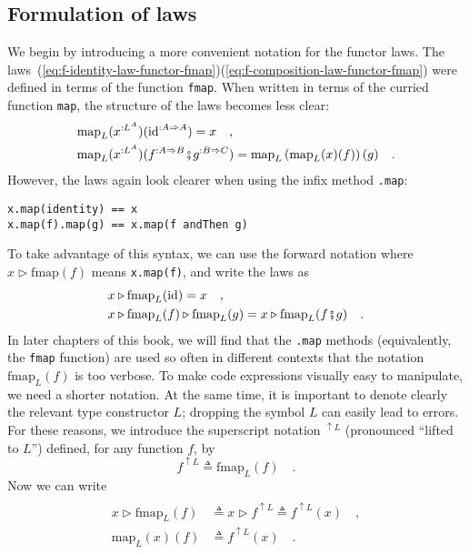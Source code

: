 \subsection{Formulation of laws}

We begin by introducing a more convenient notation for the functor
laws. The laws~(\ref{eq:f-identity-law-functor-fmap})\textendash (\ref{eq:f-composition-law-functor-fmap})
were defined in terms of the function \lstinline!fmap!. When written
in terms of the curried function \lstinline!map!, the structure of
the laws becomes less clear:
\begin{align*}
 & \text{map}_{L}(x^{:L^{A}})(\text{id}^{:A\Rightarrow A})=x\quad,\\
 & \text{map}_{L}(x^{:L^{A}})(f^{:A\Rightarrow B}\bef g^{:B\Rightarrow C})=\text{map}_{L}\left(\text{map}_{L}(x)(f)\right)(g)\quad.
\end{align*}
However, the laws again look clearer when using the infix method \lstinline!.map!:
\begin{lstlisting}
x.map(identity) == x
x.map(f).map(g) == x.map(f andThen g)
\end{lstlisting}
To take advantage of this syntax, we can use the forward
notation where $x\triangleright\text{fmap}(f)$ means \lstinline!x.map(f)!,
and write the laws as
\begin{align*}
 & x\triangleright\text{fmap}_{L}(\text{id})=x\quad,\\
 & x\triangleright\text{fmap}_{L}(f)\triangleright\text{fmap}_{L}(g)=x\triangleright\text{fmap}_{L}(f\bef g)\quad.
\end{align*}
In later chapters of this book, we will find that the \lstinline!.map!
methods (equivalently, the \lstinline!fmap! function) are used so
often in different contexts that the notation $\text{fmap}_{L}(f)$
is too verbose. To make code expressions visually easy to manipulate,
we need a shorter notation. At the same time, it is important to denote
clearly the relevant type constructor $L$; dropping the symbol $L$
can easily lead to errors. For these reasons, we introduce the superscript
notation $^{\uparrow L}$ (pronounced ``lifted to $L$'') defined,
for any function $f$, by
\[
f^{\uparrow L}\triangleq\text{fmap}_{L}(f)\quad.
\]
Now we can write 
\begin{align*}
\\
x\triangleright\text{fmap}_{L}(f) & \triangleq x\triangleright f^{\uparrow L}\triangleq f^{\uparrow L}(x)\quad,\\
\text{map}_{L}(x)(f) & \triangleq f^{\uparrow L}(x)\quad.
\end{align*}
